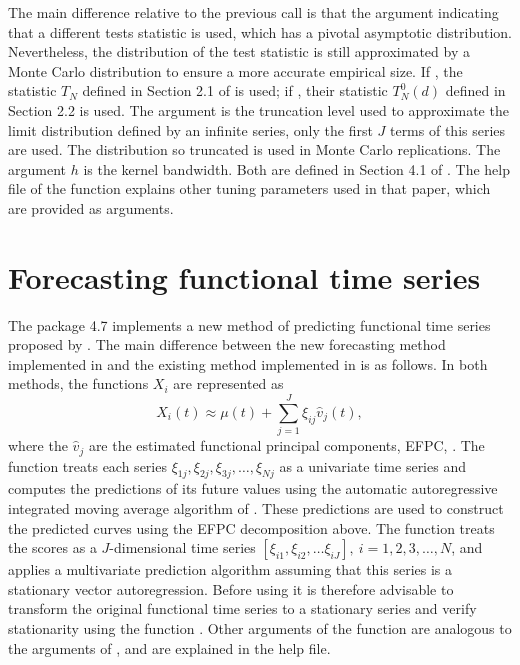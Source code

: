 \documentclass[nojss]{jss}
\begin{document}
The main difference relative to the previous call is that the argument  indicating that a different tests statistic is used,  which has a pivotal asymptotic distribution. Nevertheless, the distribution of the test statistic is still approximated by a Monte Carlo distribution to ensure a more accurate empirical size. If , the statistic $T_N$ defined in Section 2.1 of \cite{HKR14} is used; if , their statistic $T_N^0(d)$ defined in Section 2.2 is used. The argument  is the truncation level used to approximate the limit distribution defined by an infinite series, only the first $J$ terms of this series are used. The distribution so truncated is used in Monte Carlo replications. The argument $h$ is the kernel bandwidth. Both are defined in Section 4.1 of \cite{HKR14}. The help file of the function  explains other tuning parameters  used in that paper, which are provided  as arguments.  

\section{Forecasting functional time series}

The package  4.7 implements a new method of predicting functional time series proposed by \cite{ANH15}. The main difference between the new forecasting method implemented in  and the existing method implemented in  is as follows. In both methods, the functions $X_i$ are represented as
\begin{equation}
X_i(t) \approx  \mu(t) + \sum_{j=1}^J \xi_{ij} \hat v_j(t), 
\end{equation} 
where the $\hat v_j$ are the estimated functional principal components, EFPC, \citep[see e.g.,][Chapter 3]{HKbook}. The function  treats each series $\xi_{1j}, \xi_{2j}, \xi_{3j}, \ldots, \xi_{Nj}$ as a univariate time series and computes the predictions of its future values using the automatic autoregressive integrated moving average algorithm of \cite{HK08}. These predictions are used to construct the predicted curves using the EFPC decomposition above. The function  treats the scores as a $J$-dimensional  time series $[\xi_{i1}, \xi_{i2}, \ldots \xi_{iJ}], \ i=1,2,3, \ldots, N$, and applies a multivariate prediction algorithm assuming that this series is a stationary vector autoregression. Before using  it is therefore advisable to transform the original functional time series to a stationary series and verify stationarity using the function . Other arguments of the function  are analogous to the arguments of , and are explained in the help file. 
\end{document}
